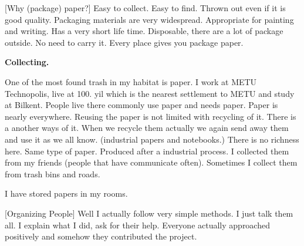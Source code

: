 [Why (package) paper?] Easy to collect. Easy to find. Thrown out even if it is good quality. Packaging materials are very widespread. Appropriate for painting and writing. Has a very short life time. Disposable, there are a lot of package outside. No need to carry it. Every place gives you package paper. 





%
%
\textbf{Collecting.} 

One of the most found trash in my habitat is paper. I work at METU Technopolis, live at 100. yil which is the nearest settlement to METU and study at Bilkent. People live there commonly use paper and needs paper. Paper is nearly everywhere. Reusing the paper is not limited with recycling of it. There is a another ways of it. When we recycle them actually we again send away them and use it as we all know. (industrial papers and notebooks.) There is no richness here. Same type of paper. Produced after a industrial process. I collected them from my friends (people that have communicate often). Sometimes I collect them from trash bins and roads.

I have stored papers in my rooms. 




[Organizing People] Well I actually follow very simple methods. I just talk them all. I explain what I did, ask for their help. Everyone actually approached positively and somehow they contributed the project. 

